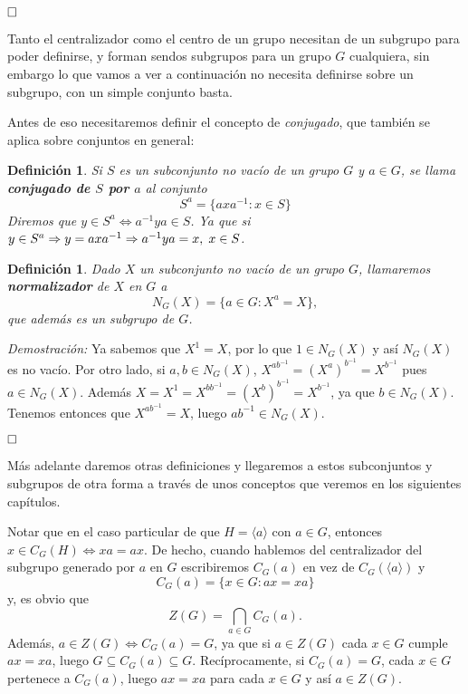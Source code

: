 \documentclass[12pt]{article}
\newtheorem{definition}[theorem]{Definición}
\begin{document}
$\hfill \square$

Tanto el centralizador como el centro de un grupo necesitan de un subgrupo para poder definirse, y forman sendos subgrupos para un grupo $G$ cualquiera, sin embargo lo que vamos a ver a continuación no necesita definirse sobre un subgrupo, con un simple conjunto basta.

Antes de eso necesitaremos definir el concepto de \textit{conjugado}, que también se aplica sobre conjuntos en general:

\begin{definition} \label{eq:conjugado} Si $S$ es un subconjunto no vacío de un grupo $G$ y $a \in G$, se llama \textbf{conjugado de $S$ por $a$} al conjunto $$S^{a} = \lbrace axa^{-1}: x \in S\rbrace$$ Diremos que $y \in S^{a} \Leftrightarrow a^{-1}ya \in S$. Ya que si $y \in S^{a} \Rightarrow y = axa^{-1}\Rightarrow a^{-1}ya = x, \hspace{0.1cm} x \in S$.
\end{definition}

\begin{definition}\label{eq:normalizador} Dado $X$ un subconjunto no vacío de un grupo $G$, llamaremos \textbf{normalizador} de $X$ en $G$ a $$N_{G}(X) = \lbrace a \in G : X^{a} = X\rbrace,$$ que además es un subgrupo de $G$.
\end{definition}

\emph{Demostración: } Ya sabemos que $X^{1} = X$, por lo que $1 \in N_{G}(X)$ y así $N_{G}(X)$ es no vacío. Por otro lado, si $a,b \in N_{G}(X)$, $X^{ab^{-1}} = (X^{a})^{b^{-1}} = X^{b^{-1}}$ pues $a \in N_{G}(X)$. Además $X = X^{1} = X^{bb^{-1}} = (X^{b})^{b^{-1}} = X^{b^{-1}}$, ya que $b \in N_{G}(X)$. Tenemos entonces que $X^{ab^{-1}} = X$, luego $ab^{-1} \in N_{G}(X)$.

$\hfill \square$

Más adelante daremos otras definiciones y llegaremos a estos subconjuntos y subgrupos de otra forma a través de unos conceptos que veremos en los siguientes capítulos.

Notar que en el caso particular de que $H = \langle a \rangle$ con $a \in G$, entonces $x \in C_{G}(H)\Leftrightarrow xa = ax$. De hecho, cuando hablemos del centralizador del subgrupo generado por $a$ en $G$ escribiremos $C_{G}(a)$ en vez de $C_{G}(\langle a \rangle)$ y $$C_{G}(a) = \lbrace x \in G : ax = xa\rbrace$$ y, es obvio que $$Z(G) = \bigcap_{a \in G} C_{G}(a).$$ Además, $a \in Z(G) \Leftrightarrow C_{G}(a) = G$, ya que si $a \in Z(G)$ cada $x \in G$ cumple $ax = xa$, luego $G \subseteq C_{G}(a) \subseteq G$. Recíprocamente, si $C_{G}(a) = G$, cada $x \in G$ pertenece a $C_{G}(a)$, luego $ax = xa$ para cada $x \in G$ y así $a \in Z(G)$.
\end{document}
